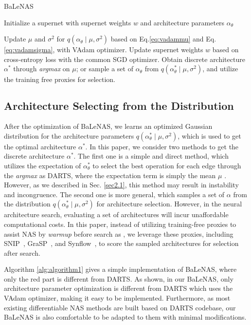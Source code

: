 \documentclass[10pt,twocolumn,letterpaper]{article}
\begin{document}
\begin{algorithm}[t]
\caption{BaLeNAS}
\label{alg:algorithm1}
Initialize a supernet with supernet weights $w$ and architecture parameters $\alpha_\theta$
\begin{algorithmic}[2]
\STATE Update {\color{red} $\mu$ and $\sigma^2$ for $q({\alpha_\theta} \mid \mu,\sigma^2)$ based on Eq.\eqref{eq:vadammu} and Eq.\eqref{eq:vadamsigma}, with VAdam optimizer.}
\STATE Update supernet weights $w$ based on cross-entropy loss with the common SGD optimizer.
\ENDWHILE
\STATE Obtain discrete architecture $\alpha^*$ through \textit{argmax} on $\mu$; or {\color{red}sample a set of $\alpha_\theta$ from $q({\alpha_\theta^*} \mid \mu,\sigma^2)$, and utilize the training free proxies for selection}.
\end{algorithmic}
\end{algorithm}


\subsection{Architecture Selecting from the Distribution}
After the optimization of BaLeNAS, we learns an optimized Gaussian distribution for the architecture parameters $q({\alpha_\theta^*} \mid \mu,\sigma^2)$, which is used to get the optimal architecture $\alpha^*$. In this paper, we consider two methods to get the discrete architecture $\alpha^*$. The first one is a simple and direct method, which utilizes the expectation of $\alpha_\theta^*$ to select the best operation for each edge through the \textit{argmax} as DARTS, where the expectation term is simply the mean $\mu$ \cite{chen2020drnas}. However, as we described in Sec. \ref{sec2.1}, this method may result in instability and incongruence. The second one is more general, which samples a set of $\alpha$ from the distribution $q({\alpha_\theta^*} \mid \mu,\sigma^2)$ for architecture selection. However, in the neural architecture search, evaluating a set of architectures will incur unaffordable computational costs. In this paper, instead of utilizing training-free proxies to assist NAS by \textit{warmup} before search as \cite{abdelfattah2021zero}, we leverage these proxies, including SNIP~\cite{lee2018snip}, GraSP~\cite{wang2019picking}, and Synflow~\cite{tanaka2020pruning}, to score the sampled architectures for selection after search.


Algorithm \ref{alg:algorithm1} gives a simple implementation of BaLeNAS, where only the red part is different from DARTS. As shown, in our BaLeNAS, only architecture parameter optimization is different from DARTS which uses the VAdam optimizer, making it easy to be implemented. Furthermore, as most existing differentiable NAS methods are built based on DARTS codebase, our BaLeNAS is also comfortable to be adapted to them with minimal modifications. 
\end{document}
